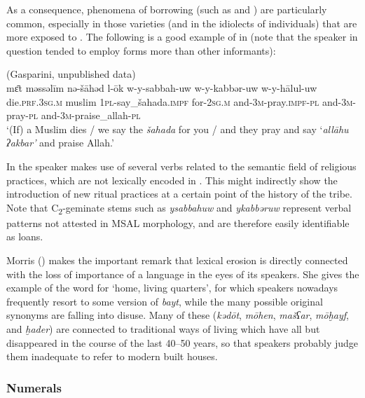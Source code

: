 \documentclass[output=paper]{langsci/langscibook}
\begin{document}
As a consequence, phenomena of borrowing (such as  and ) are particularly common, especially in those varieties (and in the idiolects of individuals) that are more exposed to . The following is a good example of  in  (note that the speaker in question tended to employ  forms more than other informants):

\ea\label{ex:key:allah}
{ (Gasparini, unpublished data)}\\
\gll mɛ̄t məssəlīm nə-šāhəd l-ōk w-y-sabbah-uw w-y-kabbər-uw w-y-hālul-uw\\
     die.\textsc{prf.3sg.m} muslim \textsc{1pl-}say\_šahada.\textsc{impf} for-\textsc{2sg.m} and-\textsc{3m-}pray.\textsc{impf-pl} and-3\textsc{m}-pray-\textsc{pl} and-\textsc{3m-}praise\_allah-\textsc{pl}\\
\glt `(If) a Muslim dies / we say the \textit{šahada} for you / and they pray and say ‘\textit{allāhu} \textit{ʔakbar’} and praise Allah.'
\z

In  the speaker makes use of several  verbs related to the semantic field of religious practices, which are not lexically encoded in . This might indirectly show the introduction of new ritual practices at a certain point of the history of the tribe. Note that C\textsubscript{2}-geminate stems such as \textit{ysabbahuw} and \mbox{\textit{ykabbəruw}} represent verbal patterns not attested in MSAL morphology, and are therefore easily identifiable as loans.

Morris (\citeyear[15]{Morris2017}) makes the important remark that lexical erosion is directly connected with the loss of importance of a language in the eyes of its speakers. She gives the example of the  word for ‘home, living quarters’, for which speakers nowadays frequently resort to some version of  \textit{bayt}, while the many possible original synonyms are falling into disuse. Many of these (\textit{kədōt}, \textit{mōhen}, \textit{mašʕar}, \textit{mōḫayf}, and \textit{ḫader}) are connected to traditional ways of living which have all but disappeared in the course of the last 40--50 years, so that speakers probably judge them inadequate to refer to modern built houses. 


 \subsubsection{Numerals}
\end{document}
